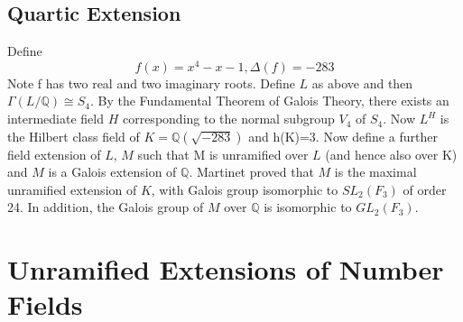 \documentclass[12pt]{extarticle}
\newcommand{\Q}{\mathbb{Q}}
\newcommand{\<}{\langle}
\renewcommand{\>}{\rangle}
\theoremstyle{definition}
\begin{document}
\subsection{Quartic Extension}
Define  \begin{equation}
    f(x)=x^4-x-1, \Delta(f)=-283
\end{equation}
Note f has two real and two imaginary roots. Define $L$ as above and then $\Gamma(L/\Q)\cong S_4$. By the Fundamental Theorem of Galois Theory, there exists an intermediate field $H$ corresponding to the normal subgroup $V_4$ of $S_4$. Now $L^H$ is the Hilbert class field of $K= \Q(\sqrt{-283})$ and h(K)=3. Now define a further field extension of $L$, $M$ such that M is unramified over $L$ (and hence also over K) and $M$ is a Galois extension of $\Q$. Martinet proved that $M$ is the maximal unramified extension of $K$, with Galois group isomorphic to $SL_2(F_3)$ of order 24. In addition, the Galois group of $M$ over $\Q$ is isomorphic to $GL_2(F_3)$. 
\begin{center}
\end{center}


\section{Unramified Extensions of Number Fields}
\end{document}
